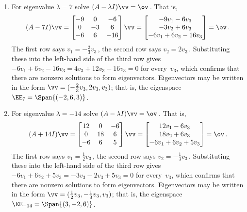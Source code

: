 \begin{example}
\begin{solution}
\begin{enumerate}
\begin{enumerate}
\item For eigenvalue \(\lambda=7\) solve \((A-\lambda I)\vv=\ov\)\,.  
That is,
\begin{equation*}
(A-7I)\vv
=\begin{bmatrix} -9&0&-6\\0&-3&6\\-6&6&-16 \end{bmatrix}\vv
=\begin{bmatrix} -9v_1-6v_3\\-3v_2+6v_3\\-6v_1+6v_2-16v_3 \end{bmatrix}
=\ov\,.
\end{equation*}
The first row says \(v_1=-\frac23v_3\)\,, 
the second row says \(v_2=2v_3\)\,.  
Substituting these into the left-hand side of the third row gives
\(-6v_1+6v_2-16v_3=4v_3+12v_3-16v_3=0\) for every~\(v_3\), which confirms that there are nonzero solutions to form eigenvectors.
Eigenvectors may be written in the form 
\(\vv=(-\frac23v_3,2v_3,v_3)\); that is, the eigenspace \(\EE_7=\Span\{(-2,6,3)\}\).

\item For eigenvalue \(\lambda=-14\) solve \((A-\lambda I)\vv=\ov\)\,.  
That is,
\begin{equation*}
(A+14I)\vv
=\begin{bmatrix} 12&0&-6\\0&18&6\\-6&6&5 \end{bmatrix}\vv
=\begin{bmatrix} 12v_1-6v_3\\18v_2+6v_3\\-6v_1+6v_2+5v_3 \end{bmatrix}
=\ov\,.
\end{equation*}
The first row says \(v_1=\frac12v_3\)\,, 
the second row says \(v_2=-\frac13v_3\)\,.  
Substituting these into the left-hand side of the third row gives
\(-6v_1+6v_2+5v_3=-3v_3-2v_3+5v_3=0\) for every~\(v_3\), which confirms that there are nonzero solutions to form eigenvectors.
Eigenvectors may be written in the form 
\(\vv=(\frac12v_3,-\frac13v_3,v_3)\); 
that is, the eigenspace \(\EE_{-14}=\Span\{(3,-2,6)\}\).

\end{enumerate}
\end{enumerate}
\end{solution}
\end{example}



